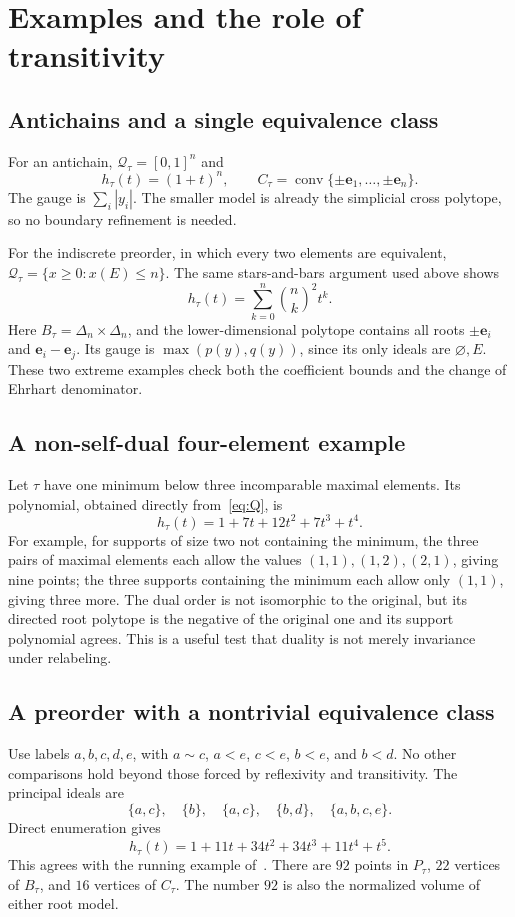 \documentclass[11pt]{article}
\numberwithin{equation}{section}
\theoremstyle{definition}
\newcommand{\Qt}{\mathcal Q_\tau}
\newcommand{\Pt}{P_\tau}
\newcommand{\conv}{\operatorname{conv}}
\newcommand{\ee}{\mathbf e}
\begin{document}
\section{Examples and the role of transitivity}\label{sec:examples}

\subsection{Antichains and a single equivalence class}

For an antichain, $\Qt=[0,1]^n$ and
\[
 h_\tau(t)=(1+t)^n,\qquad
 C_\tau=\conv\{\pm\ee_1,\ldots,\pm\ee_n\}.
\]
The gauge is $\sum_i|y_i|$. The smaller model is already the simplicial
cross polytope, so no boundary refinement is needed.

For the indiscrete preorder, in which every two elements are equivalent,
$\Qt=\{x\geq0:x(E)\leq n\}$. The same stars-and-bars argument used above
shows
\[
 h_\tau(t)=\sum_{k=0}^n\binom nk^2t^k.
\]
Here $B_\tau=\Delta_n\times\Delta_n$, and the lower-dimensional polytope
contains all roots $\pm\ee_i$ and $\ee_i-\ee_j$. Its gauge is
$\max(p(y),q(y))$, since its only ideals are $\varnothing,E$.
These two extreme examples check both the coefficient bounds and the change
of Ehrhart denominator.

\subsection{A non-self-dual four-element example}

Let $\tau$ have one minimum below three incomparable maximal elements. Its
polynomial, obtained directly from~\eqref{eq:Q}, is
\[
 h_\tau(t)=1+7t+12t^2+7t^3+t^4.
\]
For example, for supports of size two not containing the minimum, the three
pairs of maximal elements each allow the values $(1,1),(1,2),(2,1)$, giving
nine points; the three supports containing the minimum each allow only
$(1,1)$, giving three more. The dual order is not isomorphic to the original,
but its directed root polytope is the negative of the original one and its
support polynomial agrees. This is a useful test that duality is not merely
invariance under relabeling.

\subsection{A preorder with a nontrivial equivalence class}

Use labels $a,b,c,d,e$, with $a\sim c$, $a<e$, $c<e$, $b<e$, and $b<d$.
No other comparisons hold beyond those forced by reflexivity and transitivity.
The principal ideals are
\[
 \{a,c\},\quad\{b\},\quad\{a,c\},\quad\{b,d\},\quad\{a,b,c,e\}.
\]
Direct enumeration gives
\begin{equation}
 h_\tau(t)=1+11t+34t^2+34t^3+11t^4+t^5.\label{eq:running}
\end{equation}
This agrees with the running example of~\cite{AC}. There are $92$ points in
$\Pt$, $22$ vertices of $B_\tau$, and $16$ vertices of $C_\tau$.
The number $92$ is also the normalized volume of either root model.
\end{document}
